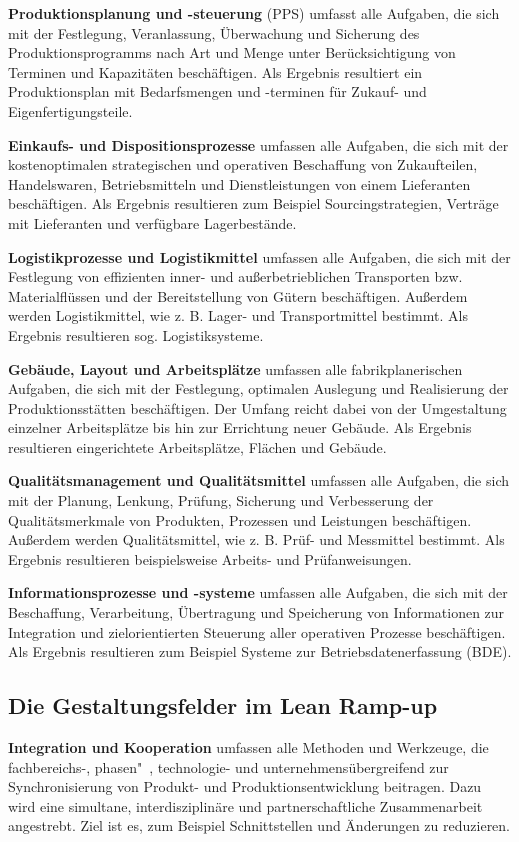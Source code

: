 \textbf{Produktionsplanung und -steuerung}
(PPS) umfasst alle Aufgaben, die sich
mit der Festlegung, Veranlassung,
Überwachung und Sicherung des Produktionsprogramms nach Art und
Menge unter Berücksichtigung von
Terminen und Kapazitäten beschäftigen. Als Ergebnis resultiert ein Produktionsplan mit Bedarfsmengen und
-terminen für Zukauf- und Eigenfertigungsteile.

 \textbf{Einkaufs- und Dispositionsprozesse}
umfassen alle Aufgaben, die sich mit
der kostenoptimalen strategischen
und operativen Beschaffung von Zukaufteilen, Handelswaren, Betriebsmitteln und Dienstleistungen von einem Lieferanten beschäftigen. Als Ergebnis resultieren zum Beispiel Sourcingstrategien, Verträge mit Lieferanten und verfügbare Lagerbestände.


 \textbf{Logistikprozesse und Logistikmittel}
umfassen alle Aufgaben, die sich mit
der Festlegung von effizienten inner-
und außerbetrieblichen Transporten
bzw. Materialflüssen und der Bereitstellung von Gütern beschäftigen.
Außerdem werden Logistikmittel, wie
z. B. Lager- und Transportmittel bestimmt. Als Ergebnis resultieren sog.
Logistiksysteme.

 \textbf{Gebäude, Layout und Arbeitsplätze}
umfassen alle fabrikplanerischen Aufgaben, die sich mit der Festlegung, optimalen Auslegung und Realisierung
der Produktionsstätten beschäftigen.
Der Umfang reicht dabei von der Umgestaltung einzelner Arbeitsplätze bis
hin zur Errichtung neuer Gebäude.
Als Ergebnis resultieren eingerichtete
Arbeitsplätze, Flächen und Gebäude.


 \textbf{Qualitätsmanagement und Qualitätsmittel} umfassen alle Aufgaben, die
sich mit der Planung, Lenkung, Prüfung, Sicherung und Verbesserung
der Qualitätsmerkmale von Produkten, Prozessen und Leistungen beschäftigen. Außerdem werden Qualitätsmittel, wie z. B. Prüf- und Messmittel bestimmt. Als Ergebnis resultieren beispielsweise Arbeits- und
Prüfanweisungen.

\textbf{Informationsprozesse und -systeme}
umfassen alle Aufgaben, die sich mit
der Beschaffung, Verarbeitung, Übertragung und Speicherung von Informationen zur Integration und zielorientierten Steuerung aller operativen Prozesse beschäftigen. Als Ergebnis resultieren zum Beispiel Systeme
zur Betriebsdatenerfassung (BDE).


\subsection*{Die Gestaltungsfelder im Lean Ramp-up}\label{appendix:dom11a:gf}
\textbf{Integration und Kooperation} umfassen
alle Methoden und Werkzeuge, die
fachbereichs-, phasen"~, technologie- und unternehmensübergreifend zur
Synchronisierung von Produkt- und
Produktionsentwicklung beitragen.
Dazu wird eine simultane, interdisziplinäre und partnerschaftliche Zusammenarbeit angestrebt. Ziel ist es,
zum Beispiel Schnittstellen und Änderungen zu reduzieren.

